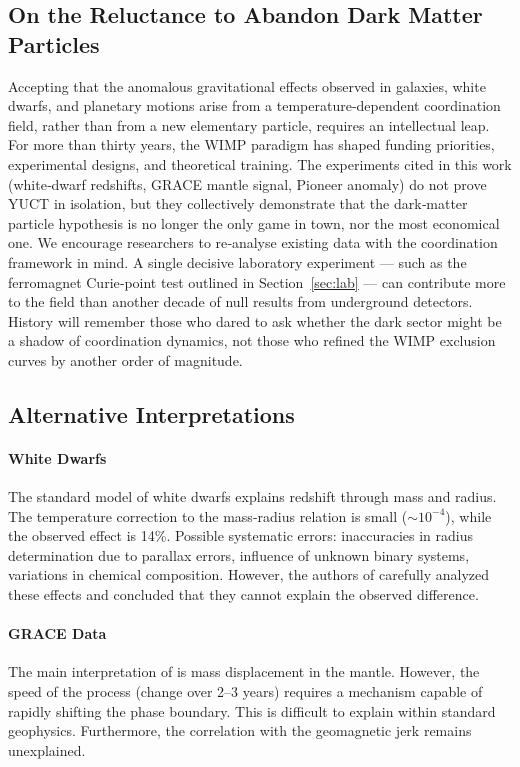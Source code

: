\documentclass[12pt]{article}
\theoremstyle{remark}
\begin{document}
	\subsection{On the Reluctance to Abandon Dark Matter Particles}
	\label{subsec:on-reluctance}
	
	Accepting that the anomalous gravitational effects observed in galaxies, 
	white dwarfs, and planetary motions arise from a temperature‑dependent 
	coordination field, rather than from a new elementary particle, requires an 
	intellectual leap.  For more than thirty years, the WIMP paradigm has shaped 
	funding priorities, experimental designs, and theoretical training.  The 
	experiments cited in this work (white‑dwarf redshifts, GRACE mantle signal, 
	Pioneer anomaly) do not prove YUCT in isolation, but they collectively 
	demonstrate that the dark‑matter particle hypothesis is no longer the only 
	game in town, nor the most economical one.  We encourage researchers to 
	re‑analyse existing data with the coordination framework in mind.  
	A single decisive laboratory experiment — such as the ferromagnet Curie‑point 
	test outlined in Section~\ref{sec:lab} — can contribute more to the field than 
	another decade of null results from underground detectors.  History will 
	remember those who dared to ask whether the dark sector might be a shadow of 
	coordination dynamics, not those who refined the WIMP exclusion curves by 
	another order of magnitude.
	
	\subsection{Alternative Interpretations}
	\label{subsec:discussion-alternatives}
	
	\paragraph{White Dwarfs}
	The standard model of white dwarfs explains redshift through mass and radius. The temperature correction to the mass-radius relation is small ($\sim 10^{-4}$), while the observed effect is 14\%. Possible systematic errors: inaccuracies in radius determination due to parallax errors, influence of unknown binary systems, variations in chemical composition. However, the authors of \cite{Crumpler2024} carefully analyzed these effects and concluded that they cannot explain the observed difference.
	
	\paragraph{GRACE Data}
	The main interpretation of \cite{Rosat2025} is mass displacement in the mantle. However, the speed of the process (change over 2–3 years) requires a mechanism capable of rapidly shifting the phase boundary. This is difficult to explain within standard geophysics. Furthermore, the correlation with the geomagnetic jerk remains unexplained.
	
\end{document}
